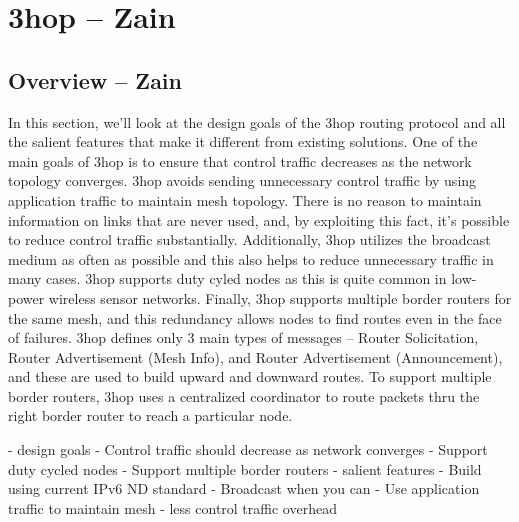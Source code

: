 \section{3hop -- Zain}

\subsection{Overview -- Zain}
In this section, we'll look at the design goals of the 3hop routing protocol and all the salient features that make it different from existing solutions. 
One of the main goals of 3hop is to ensure that control traffic decreases as the network topology converges. 
3hop avoids sending unnecessary control traffic by using application traffic to maintain mesh topology. 
There is no reason to maintain information on links that are never used, and, by exploiting this fact, it's possible to reduce control traffic substantially. 
Additionally, 3hop utilizes the broadcast medium as often as possible and this also helps to reduce unnecessary traffic in many cases.
3hop supports duty cyled nodes as this is quite common in low-power wireless sensor networks.
Finally, 3hop supports multiple border routers for the same mesh, and this redundancy allows nodes to find routes even in the face of failures.
3hop defines only 3 main types of messages -- Router Solicitation, Router Advertisement (Mesh Info), and Router Advertisement (Announcement), and these are used to build upward and downward routes.
To support multiple border routers, 3hop uses a centralized coordinator to route packets thru the right border router to reach a particular node.

- design goals
    - Control traffic should decrease as network converges
    - Support duty cycled nodes
    - Support multiple border routers
- salient features
    - Build using current IPv6 ND standard
    - Broadcast when you can
    - Use application traffic to maintain mesh
    - less control traffic overhead
\fi

